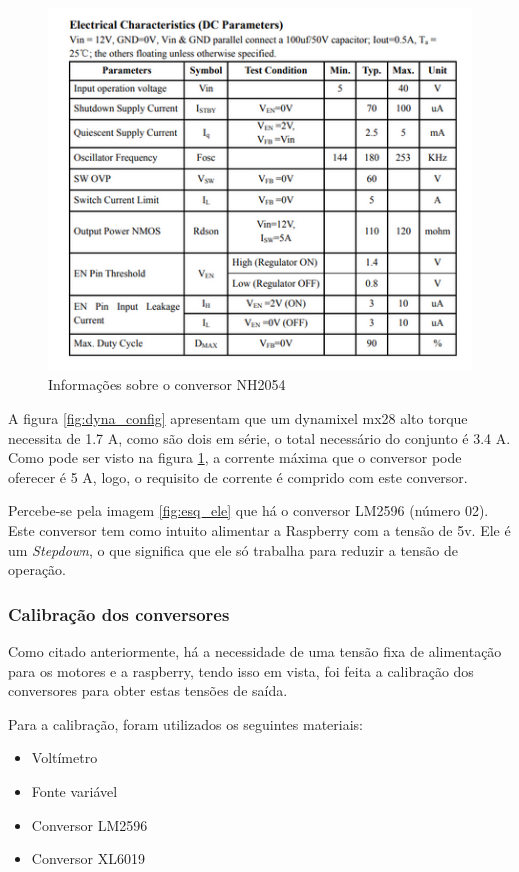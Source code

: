\begin{figure}[H]
	\centering
	\includegraphics[scale=0.7, angle=0]{Figures/NH2054_2.png}
	\caption{Informações sobre o conversor NH2054}
	\label{fig:nh2054_2}
\end{figure}

A figura \ref{fig:dyna_config} apresentam que um dynamixel mx28 alto torque necessita de 1.7 A, como são dois em série, o total necessário do conjunto é 3.4 A. Como pode ser visto na figura \ref{fig:nh2054_2}, a corrente máxima que o conversor pode oferecer é 5 A, logo, o requisito de corrente é comprido com este conversor.

Percebe-se pela imagem \ref{fig:esq_ele} que há o conversor LM2596 (número 02). Este conversor tem como intuito alimentar a Raspberry com a tensão de 5v. Ele é um \textit{Stepdown}, o que significa que ele só trabalha para reduzir a tensão de operação.

\subsubsection{Calibração dos conversores}
Como citado anteriormente, há a necessidade de uma tensão fixa de alimentação para os motores e a raspberry, tendo isso em vista, foi feita a calibração dos conversores para obter estas tensões de saída.

Para a calibração, foram utilizados os seguintes materiais:

\begin{itemize}
	\item Voltímetro
	\item Fonte variável
	\item Conversor LM2596
	\item Conversor XL6019        
\end{itemize}

